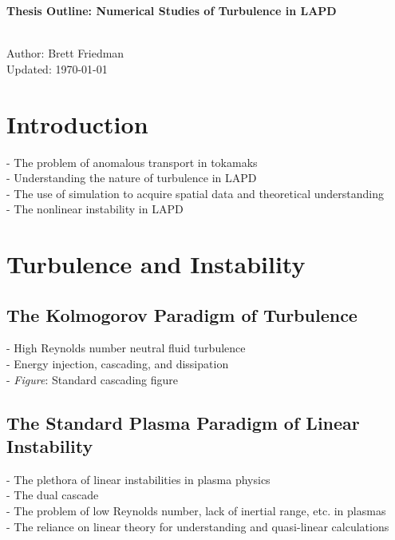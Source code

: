 \documentclass[12pt]{article}
\begin{document}
{\bf \large Thesis Outline: Numerical Studies of Turbulence in LAPD \\ \\}

Author: Brett Friedman \\
Updated: \today \\

\section{Introduction}

- The problem of anomalous transport in tokamaks \\
- Understanding the nature of turbulence in LAPD \\
- The use of simulation to acquire spatial data and theoretical understanding \\
- The nonlinear instability in LAPD \\

\section{Turbulence and Instability}

\subsection{The Kolmogorov Paradigm of Turbulence}

- High Reynolds number neutral fluid turbulence \\
- Energy injection, cascading, and dissipation \\
- \emph{Figure}: Standard cascading figure \\

\subsection{The Standard Plasma Paradigm of Linear Instability}

- The plethora of linear instabilities in plasma physics \\
- The dual cascade \\
- The problem of low Reynolds number, lack of inertial range, etc. in plasmas \\
- The reliance on linear theory for understanding and quasi-linear calculations \\
\end{document}
